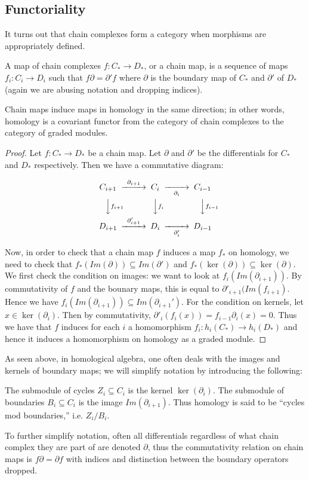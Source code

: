\subsection{Functoriality}
It turns out that chain complexes form a category when morphisms
are appropriately defined.
\begin{definition} A map of chain complexes $f:C_*\rightarrow
D_*$, or a chain map, is a sequence of maps $f_i:C_i\rightarrow
D_i$ such that $f\partial = \partial' f$ where $\partial$ is the
boundary map of $C_*$ and $\partial'$ of $D_*$ (again we are
abusing notation and dropping indices). \end{definition}
\begin{theorem} Chain maps induce maps in homology in the same
direction; in other words, homology is a covariant functor from
the category of chain complexes to the category of graded
modules.\end{theorem}
\begin{proof}
Let $f:C_*\rightarrow D_*$ be a chain map. Let $\partial$ and
$\partial'$ be the differentials for $C_*$ and $D_*$
respectively. Then we have a commutative diagram:

\begin{equation}
\begin{CD}
C_{i+1} @>\partial_{i+1}>> C_i @>>\partial_i> C_{i-1}\\
@VV f_{i+1} V          @VV f_i V             @VVf_{i-1} V\\
D_{i+1} @>\partial'_{i+1}>> D_i @>>\partial'_i> D_{i-1}
\end{CD}
\end{equation}

Now, in order to check that a chain map $f$ induces a map $f_*$
on homology, we need to check that $f_*(Im(\partial))\subseteq
Im(\partial')$ and $f_*(\ker(\partial))\subseteq
\ker(\partial)$. We first check the condition on images: we want
to look at $f_i(Im(\partial_{i+1}))$. By commutativity of $f$
and the bounary maps, this is equal to
$\partial'_{i+1}(Im(f_{i+1})$. Hence we have
$f_i(Im(\partial_{i+1}))\subseteq Im(\partial_{i+1}')$. For the
condition on kernels, let $x\in \ker(\partial_i)$. Then by
commutativity, $\partial'_i(f_i(x))=f_{i-1}\partial_i(x)=0$.
Thus we have that $f$ induces for each $i$ a homomorphism
$f_i:h_i(C_*)\rightarrow h_i(D_*)$ and hence it induces a
homomorphism on homology as a graded module. \end{proof}

As seen above, in homological algebra, one often deals with the
images and kernels of boundary maps; we will simplify notation
by introducing the following:
\begin{definition} The submodule of cycles $Z_i\subseteq C_i$ is
the kernel $\ker(\partial_i)$. The submodule of boundaries
$B_i\subseteq C_i$ is the image $Im(\partial_{i+1})$. Thus
homology is said to be ``cycles mod boundaries,'' i.e.
$Z_i/B_i$.\end{definition}
To further simplify notation, often all differentials regardless
of what chain complex they are part of are denoted $\partial$,
thus the commutativity relation on chain maps is
$f\partial=\partial f$ with indices and distinction between the
boundary operators dropped.

